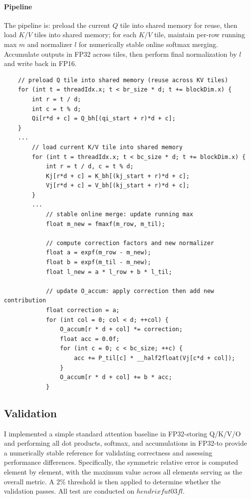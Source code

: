 \documentclass[11pt]{article}
\begin{document}
\paragraph{Pipeline}
The pipeline is: preload the current $Q$ tile into shared memory for reuse, then load $K/V$ tiles into shared memory; for each $K/V$ tile, maintain per-row running max $m$ and normalizer $l$ for numerically stable online softmax merging. Accumulate outputs in FP32 across tiles, then perform final normalization by $l$ and write back in FP16.

\begin{lstlisting}
    // preload Q tile into shared memory (reuse across KV tiles)
    for (int t = threadIdx.x; t < br_size * d; t += blockDim.x) {
        int r = t / d;
        int c = t % d;
        Qi[r*d + c] = Q_bh[(qi_start + r)*d + c];
    }
    ...
        // load current K/V tile into shared memory
        for (int t = threadIdx.x; t < bc_size * d; t += blockDim.x) {
            int r = t / d, c = t % d;
            Kj[r*d + c] = K_bh[(kj_start + r)*d + c];
            Vj[r*d + c] = V_bh[(kj_start + r)*d + c];
        }
        ...
            // stable online merge: update running max
            float m_new = fmaxf(m_row, m_til);

            // compute correction factors and new normalizer
            float a = expf(m_row - m_new);
            float b = expf(m_til - m_new);
            float l_new = a * l_row + b * l_til;

            // update O_accum: apply correction then add new contribution
            float correction = a;  
            for (int col = 0; col < d; ++col) {
                O_accum[r * d + col] *= correction;
                float acc = 0.0f;
                for (int c = 0; c < bc_size; ++c) {
                    acc += P_til[c] * __half2float(Vj[c*d + col]);
                }
                O_accum[r * d + col] += b * acc;
            }
\end{lstlisting}

\subsection{Validation}
I implemented a simple standard attention baseline in FP32-storing Q/K/V/O and performing all dot products, softmax, and accumulations in FP32-to provide a numerically stable reference for validating correctness and assessing performance differences. Specifically, the symmetric relative error is computed element by element, with the maximum value across all elements serving as the overall metric. A 2\% threshold is then applied to determine whether the validation passes. All test are conducted on $hendrixfut03fl$.
\end{document}
